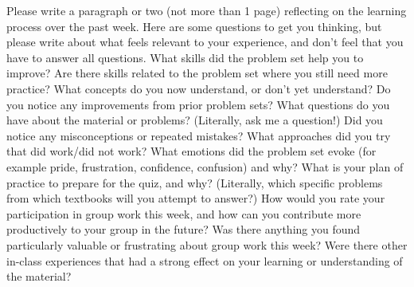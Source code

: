 \documentclass[11pt]{article}
\begin{document}

{}%




\vspace{1cm}
\Large{
Please write a paragraph or two (not more than 1 page) reflecting on the learning process over the past week. Here are some questions to get you thinking, but please write about what feels relevant to your experience, and don't feel that you have to answer all questions. What skills did the problem set help you to improve? Are there skills related to the problem set where you still need more practice? What concepts do you now understand, or don't yet understand? Do you notice any improvements from prior problem sets? What questions do you have about the material or problems? (Literally, ask me a question!) Did you notice any misconceptions or repeated mistakes? What approaches did you try that did work/did not work? What emotions did the problem set evoke (for example pride, frustration, confidence, confusion) and why? What is your plan of practice to prepare for the quiz, and why? (Literally, which specific problems from which textbooks will you attempt to answer?) How would you rate your participation in group work this week, and how can you contribute more productively to your group in the future? Was there anything you found particularly valuable or frustrating about group work this week? Were there other in-class experiences that had a strong effect on your learning or understanding of the material?}
\end{document}
